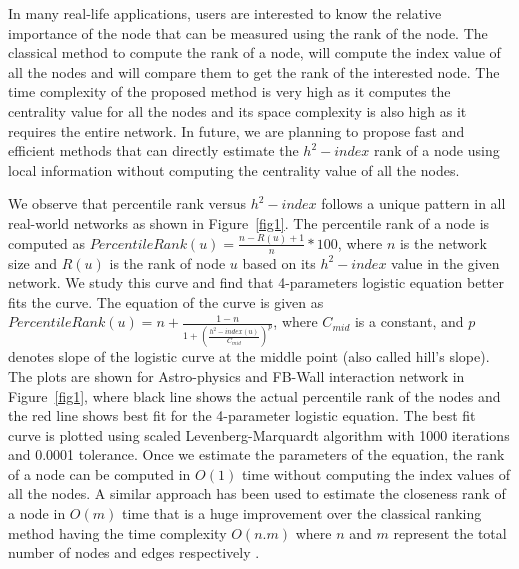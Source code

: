 \documentclass[12pt,3p]{article}
\begin{document}
In many real-life applications, users are interested to know the relative importance of the node that can be measured using the rank of the node. The classical method to compute the rank of a node, will compute the index value of all the nodes and will compare them to get the rank of the interested node. The time complexity of the proposed method is very high as it computes the centrality value for all the nodes and its space complexity is also high as it requires the entire network. In future, we are planning to propose fast and efficient methods that can directly estimate the $h^2-index$ rank of a node using local information without computing the centrality value of all the nodes. 

We observe that percentile rank versus $h^2-index$ follows a unique pattern in all real-world networks as shown in Figure~\ref{fig1}. The percentile rank of a node is computed as $PercentileRank(u)=\frac{n-R(u)+1}{n}*100$, where $n$ is the network size and $R(u)$ is the rank of node $u$ based on its $h^2-index$ value in the given network. We study this curve and find that 4-parameters logistic equation better fits the curve. The equation of the curve is given as $PercentileRank(u) = n + \frac{1-n}{1+\left( \frac{h^2-index(u)}{C_{mid}}\right) ^p}$, where $C_{mid}$ is a constant, and $p$ denotes slope of the logistic curve at the middle point (also called hill's slope). The plots are shown for Astro-physics and FB-Wall interaction network in Figure~\ref{fig1}, where black line shows the actual percentile rank of the nodes and the red line shows best fit for the 4-parameter logistic equation. The best fit curve is plotted using scaled Levenberg-Marquardt algorithm \cite{more1978levenberg} with 1000 iterations and 0.0001 tolerance. Once we estimate the parameters of the equation, the rank of a node can be computed in $O(1)$ time without computing the index values of all the nodes. A similar approach has been used to estimate the closeness rank of a node in $O(m)$ time that is a huge improvement over the classical ranking method having the time complexity $O(n.m)$ where $n$ and $m$ represent the total number of nodes and edges respectively \cite{saxena2017afaster}.
\end{document}
